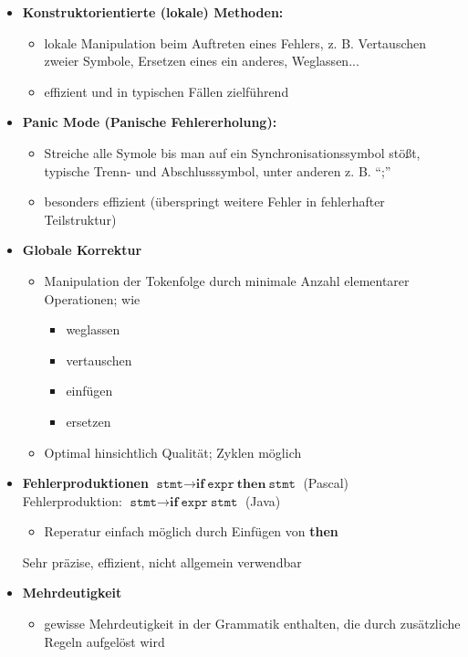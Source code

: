 \begin{itemize}
 \item \textbf{Konstruktorientierte (lokale) Methoden:}
  \begin{itemize}
  \item lokale Manipulation beim Auftreten eines Fehlers, z. B. Vertauschen zweier Symbole, Ersetzen eines ein anderes, Weglassen... \item effizient und in typischen Fällen zielführend
  \end{itemize}
 \item \textbf{Panic Mode (Panische Fehlererholung):}
  \begin{itemize}
  \item Streiche alle Symole bis man auf ein Synchronisationssymbol stößt, typische Trenn- und Abschlusssymbol, unter anderen z. B. "`;"'
  \item besonders effizient (überspringt weitere Fehler in fehlerhafter Teilstruktur)
  \end{itemize}
 \item \textbf{Globale Korrektur}
  \begin{itemize}
  \item Manipulation der Tokenfolge durch minimale Anzahl elementarer Operationen; wie
   \begin{itemize}
   \item weglassen
   \item vertauschen
   \item einfügen
   \item ersetzen
   \end{itemize}
  \item Optimal hinsichtlich Qualität; Zyklen möglich
  \end{itemize}
 \item \textbf{Fehlerproduktionen}
  \Bsp $\texttt{stmt} \to \textbf{if}\ \texttt{expr}\ \textbf{then}\ \texttt{stmt}$ (Pascal) \\
    Fehlerproduktion: $\texttt{stmt} \to \textbf{if}\ \texttt{expr}\ \texttt{stmt}$ (Java)
    \begin{itemize}
     \item Reperatur einfach möglich durch Einfügen von \textbf{then}
    \end{itemize}
    Sehr präzise, effizient, nicht allgemein verwendbar
 \item \textbf{Mehrdeutigkeit}
  \begin{itemize}
  \item gewisse Mehrdeutigkeit in der Grammatik enthalten, die durch zusätzliche Regeln aufgelöst wird\\

\end{itemize}
\end{itemize}
